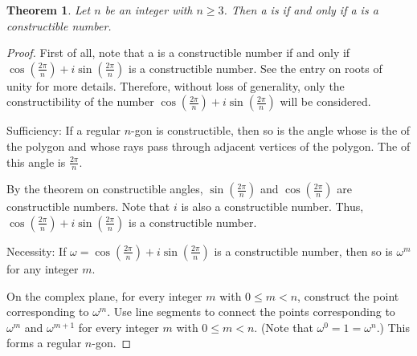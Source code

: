\documentclass[12pt]{article}
\newtheorem{thm*}{Theorem}
\begin{document}

\begin{thm*}
Let $n$ be an integer with $n \ge 3$.  Then a  is  if and only if a  is a constructible number.
\end{thm*}

\begin{proof}
First of all, note that a  is a constructible number if and only if $\displaystyle \cos\left(\frac{2\pi}{n}\right)+i\sin\left(\frac{2\pi}{n}\right)$ is a constructible number.  See the entry on roots of unity for more details.  Therefore, without loss of generality, only the constructibility of the number $\displaystyle \cos\left(\frac{2\pi}{n}\right)+i\sin\left(\frac{2\pi}{n}\right)$ will be considered.

Sufficiency:  If a regular $n$-gon is constructible, then so is the angle whose  is the  of the polygon and whose rays pass through adjacent vertices of the polygon.  The  of this angle is $\displaystyle \frac{2\pi}{n}$.

By the theorem on constructible angles, $\displaystyle \sin\left(\frac{2\pi}{n}\right)$ and $\displaystyle \cos\left(\frac{2\pi}{n}\right)$ are constructible numbers.  Note that $i$ is also a constructible number.  Thus, $\displaystyle \cos\left(\frac{2\pi}{n}\right)+i\sin\left(\frac{2\pi}{n}\right)$ is a constructible number.

Necessity:  If $\displaystyle \omega=\cos\left(\frac{2\pi}{n}\right)+i\sin\left(\frac{2\pi}{n}\right)$ is a constructible number, then so is $\omega^m$ for any integer $m$.

On the complex plane, for every integer $m$ with $0\le m<n$, construct the point corresponding to $\omega^m$.  Use line segments to connect the points corresponding to $\omega^m$ and $\omega^{m+1}$ for every integer $m$ with $0\le m<n$.  (Note that $\omega^0=1=\omega^n$.)  This forms a regular $n$-gon.
\end{proof}
\end{document}
